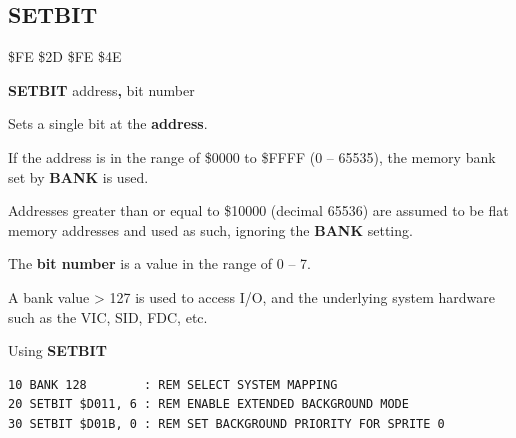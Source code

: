 \newpage
\subsection{SETBIT}
\begin{description}[leftmargin=2cm,style=nextline]
\item [Token:]    \$FE \$2D \$FE \$4E

\item [Format:]   {\bf SETBIT} address{\bf,} bit number

\item [Usage:]    Sets a single bit at the {\bf address}.

                  If the address is in the range of \$0000 to \$FFFF (0 -- 65535), the memory bank set by {\bf BANK} is used.

                  Addresses greater than or equal to \$10000 (decimal 65536) are assumed to be flat memory addresses and used as such, ignoring the {\bf BANK} setting.

                  The {\bf bit number} is a value in the range of 0 -- 7.

                  A bank value > 127 is used to access I/O, and the underlying system hardware such as the VIC, SID, FDC, etc.

\item [Example:]  Using {\bf SETBIT}

\begin{tcolorbox}[colback=black,coltext=white]
\verbatimfont{\codefont}
\begin{verbatim}
10 BANK 128        : REM SELECT SYSTEM MAPPING
20 SETBIT $D011, 6 : REM ENABLE EXTENDED BACKGROUND MODE
30 SETBIT $D01B, 0 : REM SET BACKGROUND PRIORITY FOR SPRITE 0
\end{verbatim}
\end{tcolorbox}
\end{description}


\newpage
